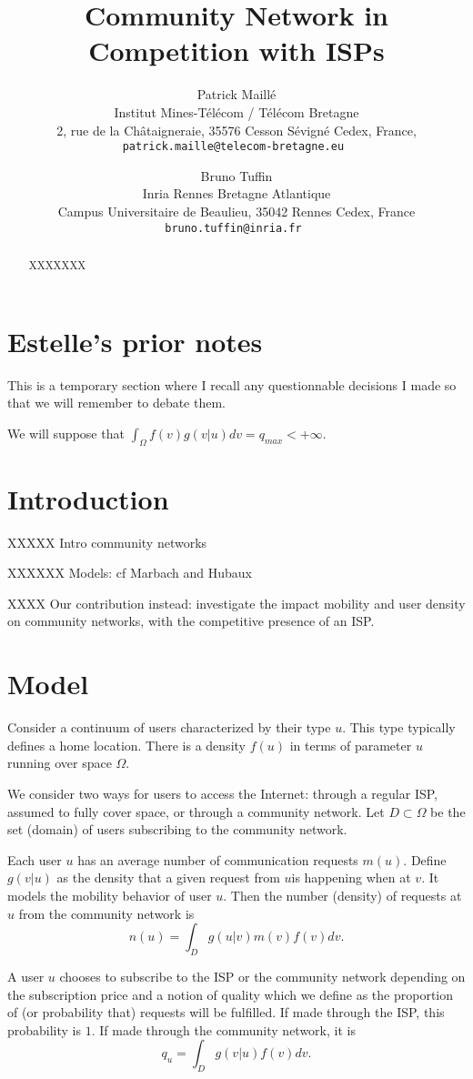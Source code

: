 \documentclass{article}
\title{Community Network in Competition with ISPs}
\author{Patrick Maill\'e\\ Institut Mines-T\'el\'ecom / T\'el\'ecom Bretagne \\ 2, rue de la Châtaigneraie, 35576 Cesson S\'evign\'e Cedex, France, \\
       \tt{patrick.maille@telecom-bretagne.eu}
\and Bruno Tuffin \\ Inria Rennes Bretagne Atlantique \\ Campus Universitaire de Beaulieu, 35042 Rennes Cedex, France \\
       \tt{bruno.tuffin@inria.fr}
       }
\begin{document}
\maketitle

\begin{abstract}
XXXXXXX
\end{abstract}

\section{Estelle's prior notes}
This is a temporary section where I recall any questionnable decisions I made so that we will remember to debate them.

We will suppose that $\int_\Omega f(v) g(v|u) dv = q_{max} < +\infty$.

\section{Introduction}


XXXXX Intro community networks

XXXXXX Models: cf Marbach and Hubaux

XXXX Our contribution instead: investigate the impact mobility and user density on community networks, with the competitive presence of an ISP.


\section{Model}

Consider a continuum of users characterized by their type $u$. This type typically defines a home location.
There is a density $f(u)$ in terms of parameter $u$ running over space $\Omega$.


We consider two ways for users to access the Internet: through a regular ISP, assumed to fully cover space, or through a community network. Let $D\subset \Omega$ be the set (domain) of users subscribing to  the community network.
 
Each user $u$ has an average number of communication requests $m(u)$. Define $g(v|u)$ as the density that a given request from $u$is happening when at $v$.
It models the mobility behavior of user $u$.
Then the number (density) of requests at $u$ from the community network is
$$
n(u) =\int_D g(u|v) m(v) f(v) dv.
$$

A user $u$ chooses to subscribe to the ISP or the community network depending on the subscription price and a notion of quality which we define as the proportion of (or probability that) requests will be fulfilled. If made through the ISP, this probability is $1$. If made through the community network, it is 
$$
q_u=\int_D g(v|u)  f(v) dv.
$$  
\end{document}
